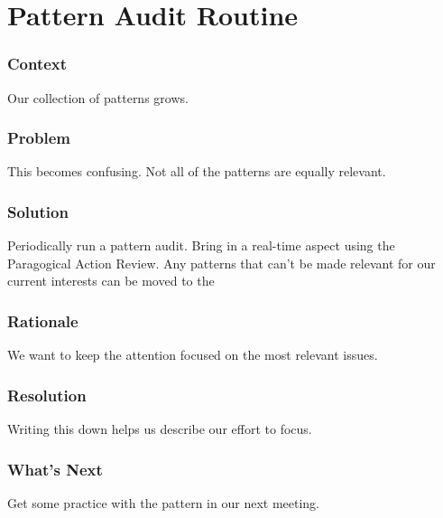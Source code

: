 \section{Pattern Audit Routine}\label{sec:Pattern_Audit}

\subsubsection*{Context} Our collection of patterns grows.

\subsubsection*{Problem} This becomes confusing.  Not all of the patterns are equally relevant.

\subsubsection*{Solution} Periodically run a pattern audit.  Bring in a real-time aspect using the Paragogical Action Review.  Any patterns that can't be made relevant for our current interests can be moved to the 

\subsubsection*{Rationale} We want to keep the attention focused on the most relevant issues.

\subsubsection*{Resolution} Writing this down helps us describe our effort to focus.

\subsubsection*{What's Next} Get some practice with the  pattern in our next meeting.
